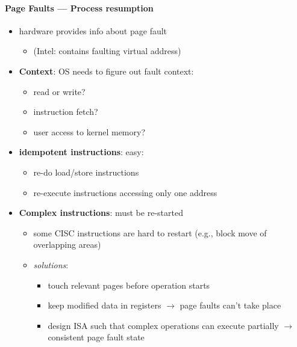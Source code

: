 \paragraph{Page Faults --- Process resumption}
\begin{itemize}
  \item hardware provides info about page fault
  \begin{itemize}
    \item (Intel:  contains faulting virtual address)
  \end{itemize}
  \item \textbf{Context}: OS needs to figure out fault context:
  \begin{itemize}
    \item read or write?
    \item instruction fetch?
    \item user access to kernel memory?
  \end{itemize}
  \item \textbf{idempotent instructions}: easy:
  \begin{itemize}
    \item re-do load/store instructions
    \item re-execute instructions accessing only one address
  \end{itemize}
  \item \textbf{Complex instructions}: must be re-started
  \begin{itemize}
    \item some CISC instructions are hard to restart (e.g., block move of overlapping areas)
    \item \emph{solutions}:
    \begin{itemize}
      \item touch relevant pages before operation starts
      \item keep modified data in registers $ \to $ page faults can't take place
      \item design ISA such that complex operations can execute partially $ \to $ consistent page fault state
    \end{itemize}
  \end{itemize}
\end{itemize}

